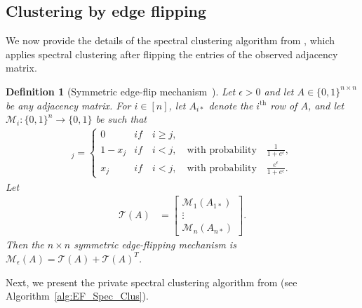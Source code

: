 \documentclass{article}
\newtheorem{definition}{Definition}
\begin{document}

\subsection{Clustering by edge flipping}
\label{AppSCFlip}

We now provide the details of the spectral clustering algorithm from \cite{HehEtal22}, which applies spectral clustering after flipping the entries of the observed adjacency matrix.

\begin{definition}[Symmetric edge-flip mechanism~\cite{HehEtal22}]
\label{def:Edge_Flip}
Let $\epsilon > 0$ and let $A \in \{0, 1\}^{n \times n}$ be any adjacency matrix. For $i \in [n]$, let $A_{i*}$ denote the $i^{\text{th}}$ row of $A$, and let $\mathcal{M}_i : \{0, 1\}^n \rightarrow \{0, 1\}$ be such that
\begin{align*}
[\mathcal{M}_i(x)]_j = 
\begin{cases}
 0 & if \quad i \geq j,\\    
  1 - x_j & if \quad  i < j, \quad \textrm{with probability} \quad \frac{1}{1 + e^\epsilon},\\
  x_j & if \quad  i < j, \quad \textrm{with probability} \quad \frac{e^\epsilon}{1 + e^\epsilon}.
\end{cases}
\end{align*}
Let
\begin{align*}
\mathcal{T}(A) &= \begin{bmatrix}
           \mathcal{M}_1(A_{1*}) \\
           \vdots \\
           \mathcal{M}_n(A_{n*})
         \end{bmatrix}.
\end{align*}
Then the $n \times n$ symmetric edge-flipping mechanism is $\mathcal{M}_\epsilon(A) = \mathcal{T}(A) + \mathcal{T}(A)^T$.
\end{definition}
Next, we present the private spectral clustering algorithm from \cite{HehEtal22} (see Algorithm~\ref{alg:EF_Spec_Clus}).
\end{document}
